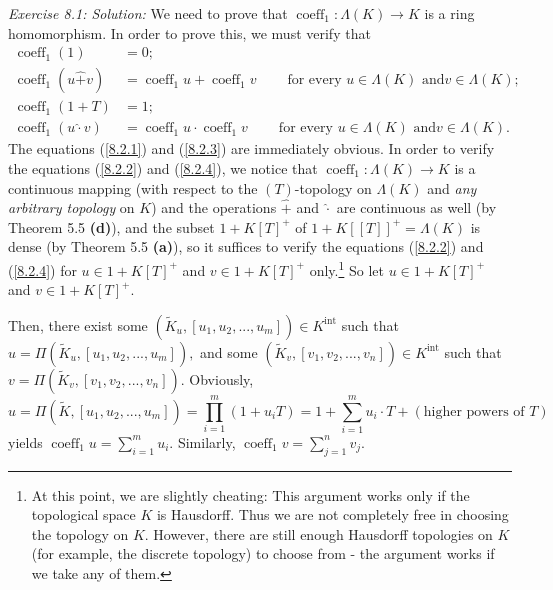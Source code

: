 \documentclass[numbers=enddot,12pt,final,onecolumn,notitlepage]{scrartcl}%
\begin{document}
\textit{Exercise 8.1: Solution:} We need to prove that $\operatorname*{coeff}%
\nolimits_{1}:\Lambda\left(  K\right)  \rightarrow K$ is a ring homomorphism.
In order to prove this, we must verify that%
\begin{align}
\operatorname*{coeff}\nolimits_{1}\left(  1\right)   &  =0;\label{8.2.1}\\
\operatorname*{coeff}\nolimits_{1}\left(  u\widehat{+}v\right)   &
=\operatorname*{coeff}\nolimits_{1}u+\operatorname*{coeff}\nolimits_{1}%
v\ \ \ \ \ \ \ \ \ \ \text{for every }u\in\Lambda\left(  K\right)  \text{ and
}v\in\Lambda\left(  K\right)  ;\label{8.2.2}\\
\operatorname*{coeff}\nolimits_{1}\left(  1+T\right)   &  =1;\label{8.2.3}\\
\operatorname*{coeff}\nolimits_{1}\left(  u\widehat{\cdot}v\right)   &
=\operatorname*{coeff}\nolimits_{1}u\cdot\operatorname*{coeff}\nolimits_{1}%
v\ \ \ \ \ \ \ \ \ \ \text{for every }u\in\Lambda\left(  K\right)  \text{ and
}v\in\Lambda\left(  K\right)  . \label{8.2.4}%
\end{align}
The equations (\ref{8.2.1}) and (\ref{8.2.3}) are immediately obvious. In
order to verify the equations (\ref{8.2.2}) and (\ref{8.2.4}), we notice that
$\operatorname*{coeff}\nolimits_{1}:\Lambda\left(  K\right)  \rightarrow K$ is
a continuous mapping (with respect to the $\left(  T\right)  $-topology on
$\Lambda\left(  K\right)  $ and \textit{any arbitrary topology} on $K$) and
the operations $\widehat{+}$ and $\widehat{\cdot}$ are continuous as well (by
Theorem 5.5 \textbf{(d)}), and the subset $1+K\left[  T\right]  ^{+}$ of
$1+K\left[  \left[  T\right]  \right]  ^{+}=\Lambda\left(  K\right)  $ is
dense (by Theorem 5.5 \textbf{(a)}), so it suffices to verify the equations
(\ref{8.2.2}) and (\ref{8.2.4}) for $u\in1+K\left[  T\right]  ^{+}$ and
$v\in1+K\left[  T\right]  ^{+}$ only.\footnote{At this point, we are slightly
cheating: This argument works only if the topological space $K$ is Hausdorff.
Thus we are not completely free in choosing the topology on $K$. However,
there are still enough Hausdorff topologies on $K$ (for example, the discrete
topology) to choose from - the argument works if we take any of them.} So let
$u\in1+K\left[  T\right]  ^{+}$ and $v\in1+K\left[  T\right]  ^{+}$.

Then, there exist some $\left(  \widetilde{K}_{u},\left[  u_{1},u_{2}%
,...,u_{m}\right]  \right)  \in K^{\operatorname*{int}}$ such that
$u=\Pi\left(  \widetilde{K}_{u},\left[  u_{1},u_{2},...,u_{m}\right]  \right)
,$ and some $\left(  \widetilde{K}_{v},\left[  v_{1},v_{2},...,v_{n}\right]
\right)  \in K^{\operatorname*{int}}$ such that $v=\Pi\left(  \widetilde{K}%
_{v},\left[  v_{1},v_{2},...,v_{n}\right]  \right)  .$ Obviously,%
\[
u=\Pi\left(  \widetilde{K},\left[  u_{1},u_{2},...,u_{m}\right]  \right)
=\prod_{i=1}^{m}\left(  1+u_{i}T\right)  =1+\sum_{i=1}^{m}u_{i}\cdot T+\left(
\text{higher powers of }T\right)
\]
yields $\operatorname*{coeff}\nolimits_{1}u=\sum\limits_{i=1}^{m}u_{i}.$
Similarly, $\operatorname*{coeff}\nolimits_{1}v=\sum\limits_{j=1}^{n}v_{j}$.
\end{document}
